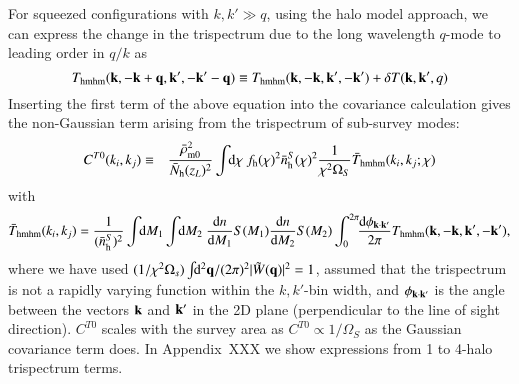 \documentclass[onecolumn,notitlepage,showpacs,amsmath,amssymb,prd,floatfix]{revtex4-1}
\newcommand{\bk}{{\bf k}}
\newcommand{\bq}{{\bf q}}
\newcommand{\tW}{\tilde{W}}
\newcommand{\dr}{\mathrm{d}}
\newcommand{\bnhs}{\bar{n}_{\rm h}^S}
\newcommand{\bNh}{\bar{N}_{\rm h}}
\begin{document}
For squeezed configurations with $k,k'\gg q$, using the halo model
approach, we can express the change in the trispectrum due to the long
wavelength $q$-mode to leading order in $q/k$ as
%
\begin{equation}
 T_{\rm hmhm}(\bk,-\bk+\bq,\bk',-\bk'-\bq)\equiv T_{\rm
  hmhm}(\bk,-\bk,\bk',-\bk')
  +\delta T(\bk,\bk',q)
  \label{eq:def_dT}
\end{equation}
%
Inserting the first term of the above equation into the covariance
calculation gives the non-Gaussian term arising from the trispectrum of
sub-survey modes:
%
\begin{eqnarray}
 C^{T0}(k_i,k_j)&\equiv &\frac{\bar{\rho}_{\rm m0}^2}{\bNh(z_L)^2}
  \int\!\!\dr\chi~f_{\rm h}(\chi)^2 \bnhs(\chi)^2\frac{1}{\chi^2\Omega_S}
    \bar{T}_{\rm
  hmhm}(k_i,k_j;\chi)
\end{eqnarray}
%
with
%
\begin{equation}
\bar{T}_{\rm hmhm}(k_i,k_j)=\frac{1}{(\bnhs)^2}\int\!\!\dr
 M_1\int\!\!\dr M_2~\frac{\dr n}{\dr M_1}S(M_1)\frac{\dr n}{\dr
 M_2}S(M_2)
 \int^{2\pi}_0\!\!\frac{\dr\phi_{\bk\cdot\bk'}}{2\pi}T_{\rm hmhm}(\bk,-\bk,\bk',-\bk'),
\end{equation}
%
where we have used
$(1/\chi^2\Omega_s)\int\!\!\dr^2\bq/(2\pi)^2|\tW(\bq)|^2=1$, assumed
that the trispectrum is not a rapidly varying function within the
$k,k'$-bin width, and $\phi_{\bk\cdot\bk'}$ is the angle between the
vectors $\bk$ and $\bk'$ in the 2D plane (perpendicular to the line of
sight direction). $C^{T0}$ scales with the survey area as $C^{T0}\propto
1/\Omega_S$ as the Gaussian covariance term does.  In Appendix~XXX we
show expressions from 1 to 4-halo trispectrum terms. 
\end{document}
